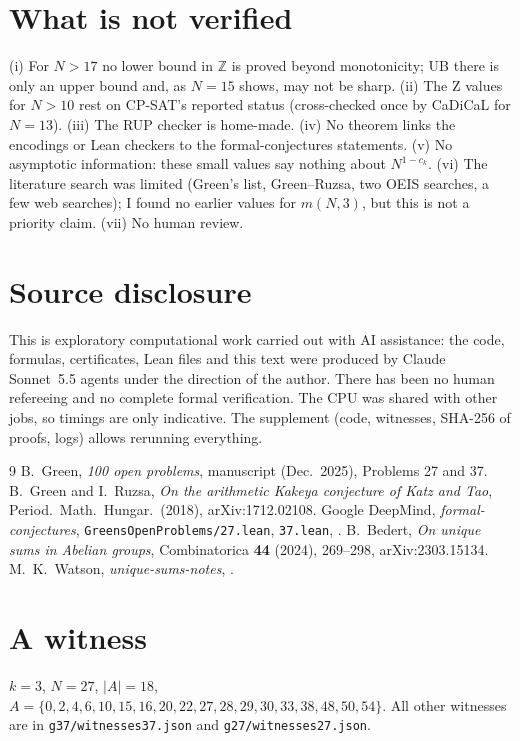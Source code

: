 \documentclass[11pt]{article}
\begin{document}
\section{What is not verified}
(i) For $N>17$ no lower bound in $\mathbb Z$ is proved beyond monotonicity; UB there is only an upper bound and, as $N=15$ shows, may not be sharp. (ii) The Z values for $N>10$ rest on CP-SAT's reported status (cross-checked once by CaDiCaL for $N=13$). (iii) The RUP checker is home-made. (iv) No theorem links the encodings or Lean checkers to the formal-conjectures statements. (v) No asymptotic information: these small values say nothing about $N^{1-c_k}$. (vi) The literature search was limited (Green's list, Green--Ruzsa, two OEIS searches, a few web searches); I found no earlier values for $m(N,3)$, but this is not a priority claim. (vii) No human review.

\section{Source disclosure}
This is exploratory computational work carried out with AI assistance: the code, formulas, certificates, Lean files and this text were produced by Claude Sonnet~5.5 agents under the direction of the author. There has been no human refereeing and no complete formal verification. The CPU was shared with other jobs, so timings are only indicative. The supplement (code, witnesses, SHA-256 of proofs, logs) allows rerunning everything.

\begin{thebibliography}{9}
 B.~Green, \emph{100 open problems}, manuscript (Dec.\ 2025), Problems 27 and 37. 
 B.~Green and I.~Ruzsa, \emph{On the arithmetic Kakeya conjecture of Katz and Tao}, Period.\ Math.\ Hungar.\ (2018), arXiv:1712.02108.
 Google DeepMind, \emph{formal-conjectures}, \texttt{GreensOpenProblems/27.lean}, \texttt{37.lean}, .
 B.~Bedert, \emph{On unique sums in Abelian groups}, Combinatorica \textbf{44} (2024), 269--298, arXiv:2303.15134.
 M.~K.~Watson, \emph{unique-sums-notes}, .
\end{thebibliography}

\appendix
\section{A witness}
$k=3$, $N=27$, $|A|=18$, $A=\{0, 2, 4, 6, 10, 15, 16, 20, 22, 27, 28, 29, 30, 33, 38, 48, 50, 54\}$. All other witnesses are in \texttt{g37/witnesses37.json} and \texttt{g27/witnesses27.json}.
\end{document}

